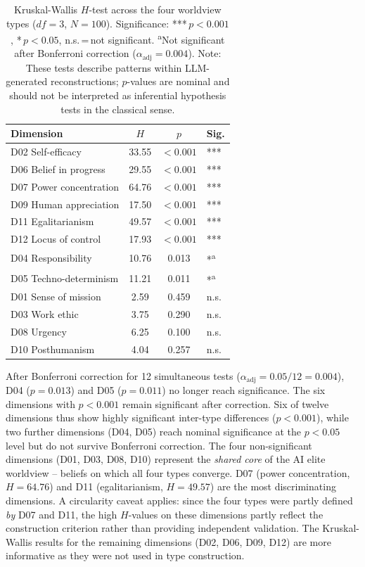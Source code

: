 \documentclass[12pt,a4paper]{article}
\begin{document}
\begin{table}[htbp]
  \centering
  \caption{Kruskal-Wallis $H$-test across the four worldview types ($df = 3$, $N = 100$). Significance: {*}{*}{*}\,$p < 0.001$, {*}\,$p < 0.05$, n.s.\,=\,not significant. \textsuperscript{a}Not significant after Bonferroni correction ($\alpha_{\mathrm{adj}} = 0.004$). Note: These tests describe patterns within LLM-generated reconstructions; $p$-values are nominal and should not be interpreted as inferential hypothesis tests in the classical sense.}
  \label{tab:kruskal}
  \footnotesize
  \begin{tabular}{l c c l}
    \toprule
    \textbf{Dimension} & $H$ & $p$ & \textbf{Sig.} \\
    \midrule
    D02 Self-efficacy & 33.55 & $< 0.001$ & {*}{*}{*} \\
    D06 Belief in progress & 29.55 & $< 0.001$ & {*}{*}{*} \\
    D07 Power concentration & 64.76 & $< 0.001$ & {*}{*}{*} \\
    D09 Human appreciation & 17.50 & $< 0.001$ & {*}{*}{*} \\
    D11 Egalitarianism & 49.57 & $< 0.001$ & {*}{*}{*} \\
    D12 Locus of control & 17.93 & $< 0.001$ & {*}{*}{*} \\
    \midrule
    D04 Responsibility & 10.76 & 0.013 & {*}\textsuperscript{a} \\
    D05 Techno-determinism & 11.21 & 0.011 & {*}\textsuperscript{a} \\
    \midrule
    D01 Sense of mission & 2.59 & 0.459 & n.s. \\
    D03 Work ethic & 3.75 & 0.290 & n.s. \\
    D08 Urgency & 6.25 & 0.100 & n.s. \\
    D10 Posthumanism & 4.04 & 0.257 & n.s. \\
    \bottomrule
  \end{tabular}
\end{table}

After Bonferroni correction for 12 simultaneous tests ($\alpha_{\mathrm{adj}} = 0.05/12 = 0.004$), D04 ($p = 0.013$) and D05 ($p = 0.011$) no longer reach significance. The six dimensions with $p < 0.001$ remain significant after correction. Six of twelve dimensions thus show highly significant inter-type differences ($p < 0.001$), while two further dimensions (D04, D05) reach nominal significance at the $p < 0.05$ level but do not survive Bonferroni correction. The four non-significant dimensions (D01, D03, D08, D10) represent the \emph{shared core} of the AI elite worldview -- beliefs on which all four types converge. D07 (power concentration, $H = 64.76$) and D11 (egalitarianism, $H = 49.57$) are the most discriminating dimensions. A circularity caveat applies: since the four types were partly defined \emph{by} D07 and D11, the high $H$-values on these dimensions partly reflect the construction criterion rather than providing independent validation. The Kruskal-Wallis results for the remaining dimensions (D02, D06, D09, D12) are more informative as they were not used in type construction.
\end{document}
